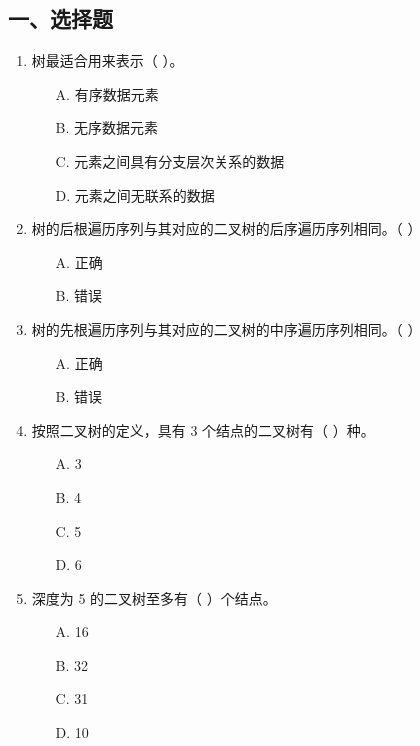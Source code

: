 \documentclass[12pt, a4paper]{article}
\begin{document}
\subsection*{一、选择题}
\begin{enumerate}
    \item 树最适合用来表示（ ）。
    \begin{enumerate}
        \item[A.] 有序数据元素
        \item[B.] 无序数据元素
        \item[C.] 元素之间具有分支层次关系的数据
        \item[D.] 元素之间无联系的数据
    \end{enumerate}
    
    \item 树的后根遍历序列与其对应的二叉树的后序遍历序列相同。（ ）
    \begin{enumerate}
        \item[A.] 正确
        \item[B.] 错误
    \end{enumerate}
    
    \item 树的先根遍历序列与其对应的二叉树的中序遍历序列相同。（ ）
    \begin{enumerate}
        \item[A.] 正确
        \item[B.] 错误
    \end{enumerate}
    
    \item 按照二叉树的定义，具有 3 个结点的二叉树有（ ）种。
    \begin{enumerate}
        \item[A.] 3
        \item[B.] 4
        \item[C.] 5
        \item[D.] 6
    \end{enumerate}
    
    \item 深度为 5 的二叉树至多有（ ）个结点。
    \begin{enumerate}
        \item[A.] 16
        \item[B.] 32
        \item[C.] 31
        \item[D.] 10
    \end{enumerate}
    

\end{enumerate}
\end{document}
